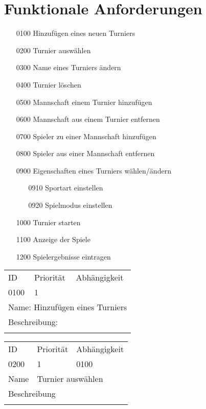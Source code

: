 \section{Funktionale Anforderungen}
	\begin{itemize}
		\item[0100] Hinzufügen eines neuen Turniers
		\item[0200] Turnier auswählen
		\item[0300] Name eines Turniers ändern
		\item[0400] Turnier löschen
		\item[0500] Mannschaft einem Turnier hinzufügen
		\item[0600] Mannschaft aus einem Turnier entfernen
		\item[0700] Spieler zu einer Mannschaft hinzufügen
		\item[0800] Spieler aus einer Mannschaft entfernen
		\item[0900] Eigenschaften eines Turniers wählen/ändern
		\begin{itemize}
			\item[0910] Sportart einstellen
			\item[0920] Spielmodus einstellen
		\end{itemize}
		\item[1000] Turnier starten
		\item[1100] Anzeige der Spiele
		\item[1200] Spielergebnisse eintragen
	\end{itemize}
	
	\begin{tabularx}{\textwidth}{|X|X|X|}
		\hline
		ID & Priorität & Abhängigkeit \\
		0100 & 1 & \\
		\hline
		\multicolumn{3}{|l|}{Name: Hinzufügen eines Turniers} \\
		\hline		
		\multicolumn{3}{|l|}{Beschreibung:}\\
		\multicolumn{3}{|l|}{}\\
		\hline		 
	\end{tabularx}
	
	\begin{tabularx}{\textwidth}{|l|l|l|}
		ID & Priorität & Abhängigkeit \\
		0200 & 1 & 0100\\
		\hline
		Name & \multicolumn{2}{|X|}{Turnier auswählen} \\
		\multicolumn{3}{|X|}{Beschreibung}\\
		\multicolumn{3}{|X|}{}\\
		\hline		 
	\end{tabularx}
	
